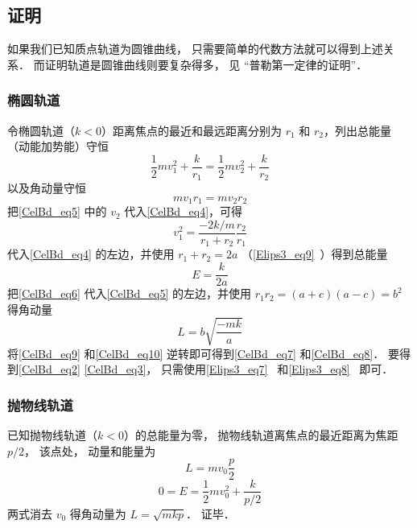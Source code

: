 \subsection{证明}
如果我们已知质点轨道为圆锥曲线， 只需要简单的代数方法就可以得到上述关系． 而证明轨道是圆锥曲线则要复杂得多， 见 “普勒第一定律的证明”．

\subsubsection{椭圆轨道}
令椭圆轨道（$k<0$）距离焦点的最近和最远距离分别为 $r_1$ 和 $r_2$，列出总能量（动能加势能）守恒
\begin{equation}\label{CelBd_eq4}
\frac12 m v_1^2 + \frac{k}{r_1} = \frac12 mv_2^2 + \frac{k}{r_2}
\end{equation}
以及角动量守恒
\begin{equation}\label{CelBd_eq5}
mv_1 r_1 = mv_2 r_2
\end{equation}
把\autoref{CelBd_eq5} 中的 $v_2$ 代入\autoref{CelBd_eq4}，可得
\begin{equation}\label{CelBd_eq6}
v_1^2 = \frac{-2k/m}{r_1 + r_2} \frac{r_2}{r_1}
\end{equation}
代入\autoref{CelBd_eq4} 的左边，并使用 $r_1+r_2=2a$ （\autoref{Elips3_eq9}~）得到总能量
\begin{equation}\label{CelBd_eq9}
E = \frac{k}{2a}
\end{equation}
把\autoref{CelBd_eq6} 代入\autoref{CelBd_eq5} 的左边，并使用 $r_1 r_2 = (a+c)(a-c) =b^2$ %
得角动量
\begin{equation}\label{CelBd_eq10}
L = b\sqrt{\frac{-mk}{a}}
\end{equation}
将\autoref{CelBd_eq9} 和\autoref{CelBd_eq10} 逆转即可得到\autoref{CelBd_eq7} 和\autoref{CelBd_eq8}． 要得到\autoref{CelBd_eq2} \autoref{CelBd_eq3}， 只需使用\autoref{Elips3_eq7}~ 和\autoref{Elips3_eq8}~ 即可．

\subsubsection{抛物线轨道}
已知抛物线轨道（$k<0$）的总能量为零， 抛物线轨道离焦点的最近距离为焦距 $p/2$， 该点处， 动量和能量为
\begin{equation}
L = mv_0 \frac p2
\end{equation}
\begin{equation}
0 = E = \frac 12 mv_0^2 + \frac{k}{p/2}
\end{equation}
两式消去 $v_0$ 得角动量为 $L = \sqrt{mkp}$． 证毕．

